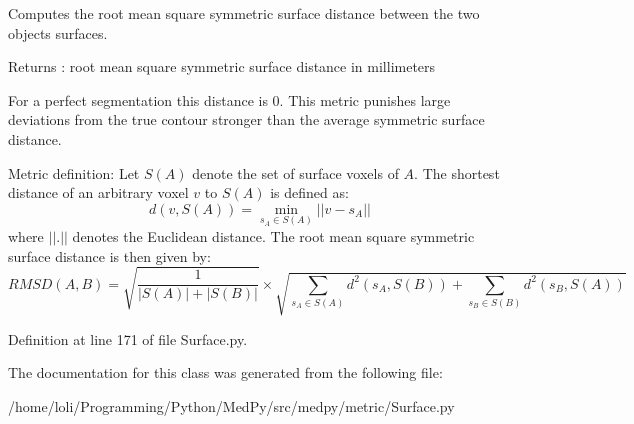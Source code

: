 Computes the root mean square symmetric surface distance between the two objects surfaces. 

\begin{DoxyReturn}{Returns}
: root mean square symmetric surface distance in millimeters
\end{DoxyReturn}
For a perfect segmentation this distance is 0. This metric punishes large deviations from the true contour stronger than the average symmetric surface distance.

Metric definition: Let $S(A)$ denote the set of surface voxels of $A$. The shortest distance of an arbitrary voxel $v$ to $S(A)$ is defined as: \[ d(v,S(A)) = \min_{s_A\in S(A)} ||v-s_A|| \] where $||.||$ denotes the Euclidean distance. The root mean square symmetric surface distance is then given by: \[ RMSD(A,B) = \sqrt{\frac{1}{|S(A)|+|S(B)|}} \times \sqrt{ \sum_{s_A\in S(A)} d^2(s_A,S(B)) + \sum_{s_B\in S(B)} d^2(s_B,S(A)) } \] 

Definition at line 171 of file Surface.py.



The documentation for this class was generated from the following file:\begin{DoxyCompactItemize}
\item 
/home/loli/Programming/Python/MedPy/src/medpy/metric/Surface.py\end{DoxyCompactItemize}
